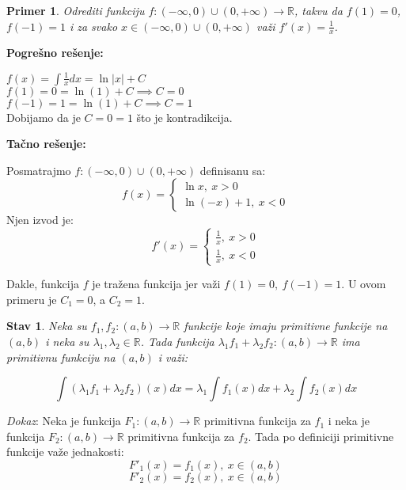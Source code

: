 \documentclass{article}
\newtheorem{stav}{Stav}[section]
\newtheorem{prim}{Primer}[section]
\begin{document}
\begin{primbox}
    \begin{prim}
        Odrediti funkciju $f: (-\infty, 0)\cup(0, +\infty)
            \longrightarrow \mathbb{R}$, takvu da $f(1) = 0$,
        $f(-1) = 1$ i za svako $x \in (-\infty, 0)
            \cup(0, +\infty)$ važi
        $f'(x) = \frac{1}{x}$.
    \end{prim}
    \textbf{Pogrešno rešenje:}\par
    $f(x) = \int \frac{1}{x}dx = \ln|x| + C$\\
    $f(1) = 0 = \ln(1) + C \implies C = 0$\\
    $f(-1) = 1 = \ln(1) + C \implies C = 1$\\
    Dobijamo da je $C=0=1$ što je kontradikcija.\par
    \textbf{Tačno rešenje:}\par
    Posmatrajmo $f: (-\infty, 0)\cup(0, +\infty)$
    definisanu sa:
    $$
        f(x) =
        \begin{cases}
            \ln x,\ x > 0 \\
            \ln (-x) + 1,\ x < 0
        \end{cases}
    $$
    Njen izvod je:
    $$f'(x) =
        \begin{cases}
            \frac{1}{x},\ x > 0 \\
            \frac{1}{x},\ x < 0
        \end{cases}$$

    Dakle, funkcija $f$ je tražena funkcija jer važi
    $f(1) = 0,\ f(-1) = 1$. U ovom primeru je $C_1=0$, a $C_2=1$.
\end{primbox}

\begin{stavbox}
    \begin{stav}
        Neka su $f_1, f_2 : (a, b) \longrightarrow \mathbb{R}$
        funkcije koje imaju primitivne funkcije na $(a, b)$ i neka
        su $\lambda_1 , \lambda_2 \in \mathbb{R}$. Tada funkcija
        $\lambda_1 f_1 + \lambda_2 f_2 : (a, b) \longrightarrow
            \mathbb{R}$ ima primitivnu funkciju na $(a, b)$ i važi:\par
        $$\int (\lambda_1 f_1 + \lambda_2 f_2)(x)dx = \lambda_1\int
            f_1(x) dx + \lambda_2\int f_2(x) dx$$
    \end{stav}
\end{stavbox}
\setcounter{equation}{0}
\textit{Dokaz}: Neka je funkcija $F_1: (a, b) \longrightarrow \mathbb{R}$
primitivna funkcija za $f_1$ i neka je funkcija $F_2: (a, b)
    \longrightarrow \mathbb{R}$ primitivna funkcija za $f_2$.
Tada po definiciji primitivne funkcije važe jednakosti:
\begin{equation} \label{stav_1.2.1}
    F'_1(x) = f_1(x),\ x \in (a, b)
\end{equation}
\begin{equation} \label{stav_1.2.2}
    F'_2(x) = f_2(x),\ x \in (a, b)
\end{equation}
\end{document}
